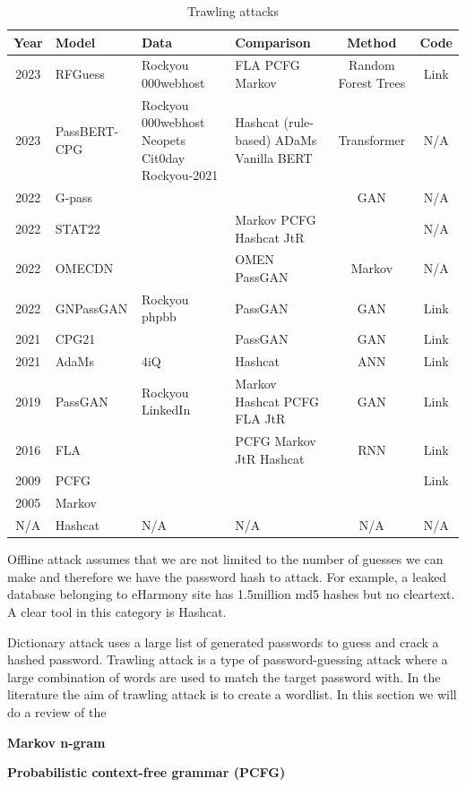 \begin{table}
\caption{Trawling attacks}
\begin{tabularx}{\textwidth}{clp{3cm}p{3cm}cc}
\toprule
Year & Model & Data & Comparison & Method & Code \\
\midrule
2023 & RFGuess & Rockyou
000webhost & FLA
PCFG
Markov & Random Forest Trees & Link \\
2023 & PassBERT-CPG & Rockyou
000webhost
Neopets
Cit0day
Rockyou-2021 & Hashcat (rule-based)
ADaMs
Vanilla BERT & Transformer & N/A \\
2022 & G-pass & & & GAN & N/A \\
2022 & STAT22 & & Markov
PCFG
Hashcat
JtR & & N/A \\
2022 & OMECDN & & OMEN
PassGAN & Markov & N/A \\
2022 & GNPassGAN & Rockyou
phpbb & PassGAN & GAN & Link \\
2021 & CPG21 & & PassGAN & GAN & Link \\
2021 & AdaMs & 4iQ & Hashcat & ANN & Link \\
2019 & PassGAN & Rockyou
LinkedIn & Markov
Hashcat
PCFG
FLA
JtR & GAN & Link \\
2016 & FLA & & PCFG
Markov
JtR
Hashcat & RNN & Link \\
2009 & PCFG & & & & Link \\
2005 & Markov & & & & \\
N/A & Hashcat & N/A & N/A & N/A & N/A \\
\bottomrule
\end{tabularx}
\end{table}

Offline attack assumes that we are not limited to the number of guesses
we can make and therefore we have the password hash to attack. For
example, a leaked database belonging to eHarmony site has 1.5million md5
hashes but no cleartext. A clear tool in this category is Hashcat.

Dictionary attack uses a large list of generated passwords to guess and
crack a hashed password. Trawling attack is a type of password-guessing
attack where a large combination of words are used to match the target
password with. In the literature the aim of trawling attack is to create
a wordlist. In this section we will do a review of the

\textbf{Markov n-gram} \cite{narayanan_fast_2005}

\textbf{Probabilistic context-free grammar (PCFG)} \cite{weir_password_2009}

